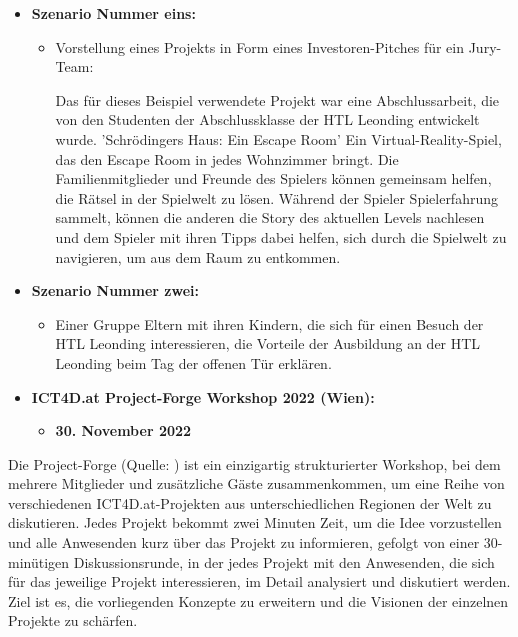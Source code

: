 \begin{itemize}
    \item \textbf{Szenario Nummer eins: }
          \begin{itemize}
              \item {Vorstellung eines Projekts in Form eines Investoren-Pitches für ein Jury-Team:

                    Das für dieses Beispiel verwendete Projekt war eine Abschlussarbeit, die von den Studenten der Abschlussklasse der HTL Leonding entwickelt wurde. 'Schrödingers Haus: Ein Escape Room' Ein Virtual-Reality-Spiel, das den Escape Room in jedes Wohnzimmer bringt. Die Familienmitglieder und Freunde des Spielers können gemeinsam helfen, die Rätsel in der Spielwelt zu lösen. Während der Spieler Spielerfahrung sammelt, können die anderen die Story des aktuellen Levels nachlesen und dem Spieler mit ihren Tipps dabei helfen, sich durch die Spielwelt zu navigieren, um aus dem Raum zu entkommen.}
          \end{itemize}
    \item \textbf{Szenario Nummer zwei: }
          \begin{itemize}
              \item {Einer Gruppe Eltern mit ihren Kindern, die sich für einen Besuch der HTL Leonding interessieren, die Vorteile der Ausbildung an der HTL Leonding beim Tag der offenen Tür erklären.}
          \end{itemize}
\end{itemize}

\begin{itemize}
    \item \textbf{ICT4D.at Project-Forge Workshop 2022 (Wien):}
          \begin{itemize}
              \item \textbf{30. November 2022}
          \end{itemize}
\end{itemize}


Die Project-Forge (Quelle: ) ist ein einzigartig strukturierter Workshop, bei dem mehrere Mitglieder und zusätzliche Gäste zusammenkommen, um eine Reihe von verschiedenen ICT4D.at-Projekten aus unterschiedlichen Regionen der Welt zu diskutieren. Jedes Projekt bekommt zwei Minuten Zeit, um die Idee vorzustellen und alle Anwesenden kurz über das Projekt zu informieren, gefolgt von einer 30-minütigen Diskussionsrunde, in der jedes Projekt mit den Anwesenden, die sich für das jeweilige Projekt interessieren, im Detail analysiert und diskutiert werden. Ziel ist es, die vorliegenden Konzepte zu erweitern und die Visionen der einzelnen Projekte zu schärfen.

